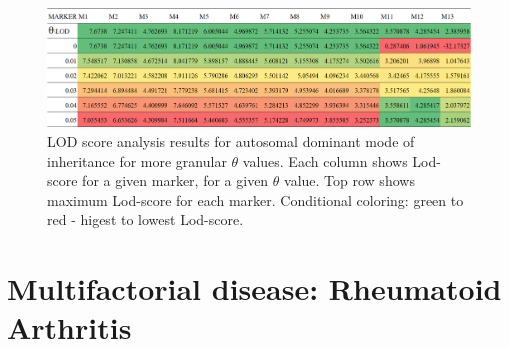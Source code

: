 \documentclass[a4paper,12pt]{article}
\begin{document}
\begin{figure}[t] %
    \centering
    \includegraphics[width=\textwidth]{images/xdom_lod_analysis_more_granular.png}
    \caption{LOD score analysis results for autosomal dominant mode of inheritance for more 
    granular $\theta$ values. Each column shows Lod-score for a given marker, for a given 
    $\theta$ value. Top row shows maximum Lod-score for each marker. Conditional coloring: 
    green to red - higest to lowest Lod-score.}   
    \label{fig:xdom_lodscore_granular} 
    
\end{figure}



\newpage
    \section{Multifactorial disease: Rheumatoid Arthritis}
\end{document}
